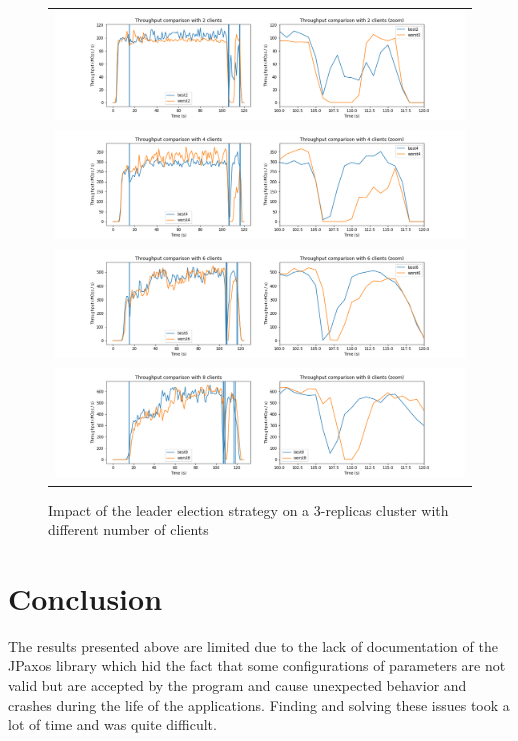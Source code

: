 \documentclass[a4paper, 10pt]{article}
\begin{document}
\begin{figure}[H]
    \label{plots}
    \caption{Impact of the leader election strategy on a 3-replicas cluster with different number of clients}
    \centering
    \begin{tabular}{c}
        \includegraphics[width=\textwidth]{comp2} \\
        \includegraphics[width=\textwidth]{comp4} \\
        \includegraphics[width=\textwidth]{comp6} \\
        \includegraphics[width=\textwidth]{comp8} \\
    \end{tabular}
    \label{experiment}
\end{figure}

\section{Conclusion}
The results presented above are limited due to the lack of documentation of the JPaxos library which hid the fact that some configurations of parameters are not valid but are accepted by the program and cause unexpected behavior and crashes during the life of the applications. Finding and solving these issues took a lot of time and was quite difficult.
\end{document}
